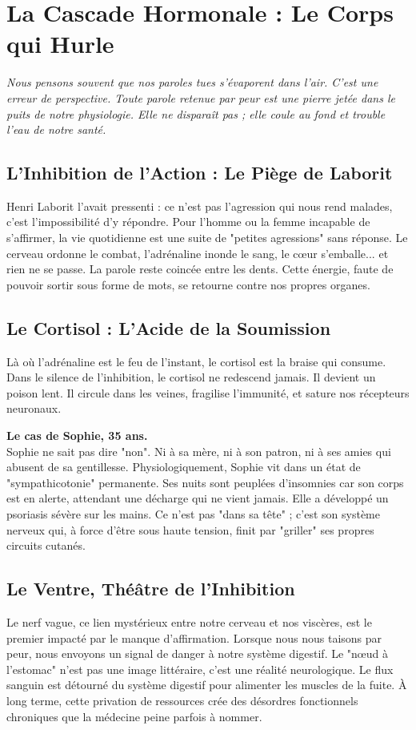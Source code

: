 \chapter{La Cascade Hormonale : Le Corps qui Hurle}

\textit{Nous pensons souvent que nos paroles tues s'évaporent dans l'air. C'est une erreur de perspective. Toute parole retenue par peur est une pierre jetée dans le puits de notre physiologie. Elle ne disparaît pas ; elle coule au fond et trouble l'eau de notre santé.}

\section{L'Inhibition de l'Action : Le Piège de Laborit}
Henri Laborit l'avait pressenti : ce n'est pas l'agression qui nous rend malades, c'est l'impossibilité d'y répondre. Pour l'homme ou la femme incapable de s'affirmer, la vie quotidienne est une suite de "petites agressions" sans réponse. Le cerveau ordonne le combat, l'adrénaline inonde le sang, le cœur s'emballe... et rien ne se passe. La parole reste coincée entre les dents. Cette énergie, faute de pouvoir sortir sous forme de mots, se retourne contre nos propres organes.

\section{Le Cortisol : L'Acide de la Soumission}
Là où l'adrénaline est le feu de l'instant, le cortisol est la braise qui consume. Dans le silence de l'inhibition, le cortisol ne redescend jamais. Il devient un poison lent. Il circule dans les veines, fragilise l'immunité, et sature nos récepteurs neuronaux. 

\begin{NoteClinique}
\textbf{Le cas de Sophie, 35 ans.} \\
Sophie ne sait pas dire "non". Ni à sa mère, ni à son patron, ni à ses amies qui abusent de sa gentillesse. Physiologiquement, Sophie vit dans un état de "sympathicotonie" permanente. Ses nuits sont peuplées d'insomnies car son corps est en alerte, attendant une décharge qui ne vient jamais. Elle a développé un psoriasis sévère sur les mains. Ce n'est pas "dans sa tête" ; c'est son système nerveux qui, à force d'être sous haute tension, finit par "griller" ses propres circuits cutanés.
\end{NoteClinique}

\section{Le Ventre, Théâtre de l'Inhibition}
Le nerf vague, ce lien mystérieux entre notre cerveau et nos viscères, est le premier impacté par le manque d'affirmation. Lorsque nous nous taisons par peur, nous envoyons un signal de danger à notre système digestif. Le "nœud à l'estomac" n'est pas une image littéraire, c'est une réalité neurologique. Le flux sanguin est détourné du système digestif pour alimenter les muscles de la fuite. À long terme, cette privation de ressources crée des désordres fonctionnels chroniques que la médecine peine parfois à nommer.

